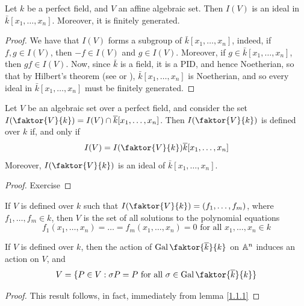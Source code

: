 \begin{lemma}\label{1.1.2}
    Let $k$ be a perfect field, and $V$ an affine algebraic set. Then $I(V)$ is
    an ideal in $\bar{k}[x_1, \dots, x_n]$. Moreover, it is finitely generated.
\end{lemma}
\begin{proof}
    We have that $I(V)$ forms a subgroup of $\bar{k}[x_1, \dots, x_n]$, indeed,
    if $f,g \in I(V)$, then $-f \in I(V)$ and $g \in I(V)$. Moreover, if $g \in
    \bar{k}[x_1, \dots, x_n]$, then $gf \in I(V)$. Now, since $\bar{k}$ is a
    field, it is a PID, and hence Noetherian, so that by Hilbert's theorem (see
    \cite{atiyah-macdonald} or \cite{eisenbud}), $\bar{k}[x_1, \dots, x_n]$ is
    Noetherian, and so every ideal in $\bar{k}[x_1, \dots, x_n]$ must be finitely
    generated.
\end{proof}

\begin{lemma}\label{1.1.3}
    Let $V$ be an algebraic set over a perfect field, and consider the set
    $I(\faktor{V}{k})=I(V) \cap \bar{k}[x_1, \dots, x_n]$. Then $I(\faktor{V}{k})$
    is defined over $k$ if, and only if
    \begin{equation*}
        I(V)=I(\faktor{V}{k})\bar{k}[x_1, \dots, x_n]
    \end{equation*}
    Moreover, $I(\faktor{V}{k})$ is an ideal of $\bar{k}[x_1, \dots, x_n]$.
\end{lemma}
\begin{proof}
    Exercise
\end{proof}
\begin{corollary}
    If $V$ is defined over $k$ such that $I(\faktor{V}{k})=(f_1, \dots, f_m)$,
    where $f_1, \dots, f_m \in k$, then $V$ is the set of all solutions
    to the polynomial equations
    \begin{equation*}
        f_1(x_1, \dots, x_n)= \dots =f_m(x_1, \dots, x_n)=0 \text{ for all }
        x_1, \dots, x_n \in k
    \end{equation*}
\end{corollary}
\begin{corollary}
    If $V$ is defined over $k$, then the action of $\Gal{\faktor{\bar{k}}{k}}$
    on $\mathbb{A}^n$ induces an action on $V$, and
    \begin{equation*}
        V=\{P \in V : \s{P}=P \text{ for all } \s \in
        \Gal{\faktor{\bar{k}}{k}}\}
    \end{equation*}
\end{corollary}
\begin{proof}
    This result follows, in fact, immediately from lemma \ref{1.1.1}
\end{proof}

